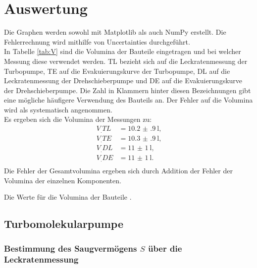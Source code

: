 \section{Auswertung}
\label{sec:Auswertung}

Die Graphen werden sowohl mit Matplotlib \cite{matplotlib} als auch NumPy \cite{numpy} erstellt. Die Fehlerrechnung wird mithilfe von Uncertainties \cite{uncertainties} durchgeführt.\\
In Tabelle \ref{tab:V} sind die Volumina der Bauteile eingetragen und bei welcher Messung diese verwendet werden. TL bezieht sich auf die Leckratenmessung der Turbopumpe, TE auf die Evakuierungskurve der Turbopumpe, DL auf die Leckratenmessung der Drehschieberpumpe und DE auf die Evakuierungskurve der Drehschieberpumpe. Die Zahl in Klammern hinter diesen Bezeichnungen gibt eine mögliche häufigere Verwendung des Bauteils an. Der Fehler auf die Volumina wird als systematisch angenommen.\\
Es ergeben sich die Volumina der Messungen zu:
\begin{align*}
V_.{TL}	&= \SI{10.2(9)}{\litre}\text{,}\\
V_.{TE}	&= \SI{10.3(9)}{\litre}\text{,}\\
V_.{DL}	&= \SI{11(1)}{\litre}\text{,}\\
V_.{DE}	&= \SI{11(1)}{\litre}\text{.}\\
\end{align*}
Die Fehler der Gesamtvolumina ergeben sich durch Addition der Fehler der Volumina der einzelnen Komponenten. 

\begin{table}
\centering
\caption{Die Werte für die Volumina der Bauteile \cite{V70}.}

\label{tab:V}
\end{table}

\subsection{Turbomolekularpumpe}

\subsubsection{Bestimmung des Saugvermögens $S$ über die Leckratenmessung}

